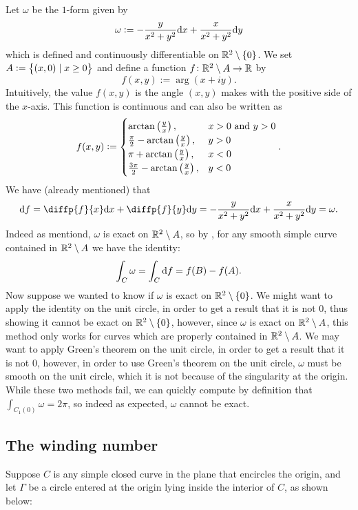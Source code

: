 \documentclass[11pt,a4paper]{article}
\begin{document}
\begin{example}
  \label{exmp:famous-form}
  Let $\omega$ be the $1$-form given by
  \[
    \omega := -\frac{y}{x^2 + y^2}\dx + \frac{x}{x^2 + y^2}\dy
  \]
  which is defined and continuously differentiable on
  $\mathbb{R}^2 \setminus \left\{0\right\}$.
  We set $A := \left\{(x,0) \mid x \geq 0\right\}$ and define a function
  $f \colon \mathbb{R}^2 \setminus A \to \mathbb{R}$ by
  \[
    f(x,y) := \arg(x + iy).
  \]
  Intuitively, the value $f(x,y)$ is the angle $(x,y)$ makes with
  the positive side of the $x$-axis.
  This function is continuous and can also be written as
  \[
    f(x,y) :=
    \begin{cases}
      \arctan\del{\frac{y}{x}}, &x > 0 \stand y > 0 \\
      \frac{\pi}{2} - \arctan\del{\frac{y}{x}}, &y > 0 \\
      \pi + \arctan\del{\frac{y}{x}}, &x < 0 \\
      \frac{3\pi}{2} - \arctan\del{\frac{y}{x}}, &y < 0
    \end{cases}.
  \]
  We have (already mentioned) that
  \[
    \df =
    \diffp{f}{x} \dx + \diffp{f}{y} \dy =
    -\frac{y}{x^2 + y^2}\dx + \frac{x}{x^2 + y^2}\dy = \omega.
  \]
  Indeed as mentiond, $\omega$ is exact on $\mathbb{R}^2 \setminus A$,
  so by ,
  for any smooth simple curve contained in $\mathbb{R}^2 \setminus A$ we have
  the identity:
  \[
    \int_{C} \omega =
    \int_{C} \mathrm{d} f =
    f(B) - f(A).
  \]
  Now suppose we wanted to know if $\omega$ is exact on $\mathbb{R}^2 \setminus \left\{0\right\}$.
  We might want to apply the identity on the unit circle,
  in order to get a result that it is not $0$,
  thus showing it cannot be exact on $\mathbb{R}^2 \setminus \left\{0\right\}$,
  however, since $\omega$ is exact on $\mathbb{R}^2 \setminus A$,
  this method only works for curves which are properly contained
  in $\mathbb{R}^2 \setminus A$.
  We may want to apply Green's theorem on the unit circle,
  in order to get a result that it is not $0$,
  however, in order to use Green's theorem on the unit circle,
  $\omega$ must be smooth on the unit circle,
  which it is not because of the singularity at the origin.
  While these two methods fail, we can quickly compute by definition
  that $\int_{C_1(0)} \omega = 2\pi$,
  so indeed as expected, $\omega$ cannot be exact.
\end{example}

\subsection{The winding number}
Suppose $C$ is any simple closed curve in the plane that encircles
the origin, and let $\Gamma$ be a circle entered at the origin
lying inside the interior of $C$, as shown below:
\end{document}
